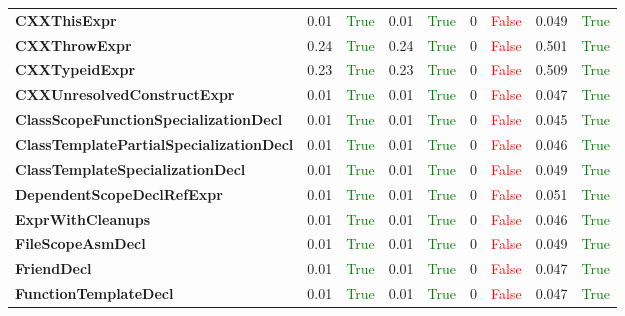 \documentclass{article}
\begin{document}
\begin{xltabular}{\textwidth}{lcccccccc}
\textbf{{\fontsize{10}{12}\selectfont CXXThisExpr}}& 0.01&\textcolor{green}{True}& 0.01&\textcolor{green}{True}& 0&\textcolor{red}{False}& 0.049&\textcolor{green}{True} \\[0.5ex]
\textbf{{\fontsize{10}{12}\selectfont CXXThrowExpr}}& 0.24&\textcolor{green}{True}& 0.24&\textcolor{green}{True}& 0&\textcolor{red}{False}& 0.501&\textcolor{green}{True} \\[0.5ex]
\textbf{{\fontsize{10}{12}\selectfont CXXTypeidExpr}}& 0.23&\textcolor{green}{True}& 0.23&\textcolor{green}{True}& 0&\textcolor{red}{False}& 0.509&\textcolor{green}{True} \\[0.5ex]
\textbf{{\fontsize{10}{12}\selectfont CXXUnresolvedConstructExpr}}& 0.01&\textcolor{green}{True}& 0.01&\textcolor{green}{True}& 0&\textcolor{red}{False}& 0.047&\textcolor{green}{True} \\[0.5ex]
\textbf{{\fontsize{10}{12}\selectfont ClassScopeFunctionSpecializationDecl}}& 0.01&\textcolor{green}{True}& 0.01&\textcolor{green}{True}& 0&\textcolor{red}{False}& 0.045&\textcolor{green}{True} \\[0.5ex]
\textbf{{\fontsize{10}{12}\selectfont ClassTemplatePartialSpecializationDecl}}& 0.01&\textcolor{green}{True}& 0.01&\textcolor{green}{True}& 0&\textcolor{red}{False}& 0.046&\textcolor{green}{True} \\[0.5ex]
\textbf{{\fontsize{10}{12}\selectfont ClassTemplateSpecializationDecl}}& 0.01&\textcolor{green}{True}& 0.01&\textcolor{green}{True}& 0&\textcolor{red}{False}& 0.049&\textcolor{green}{True} \\[0.5ex]
\textbf{{\fontsize{10}{12}\selectfont DependentScopeDeclRefExpr}}& 0.01&\textcolor{green}{True}& 0.01&\textcolor{green}{True}& 0&\textcolor{red}{False}& 0.051&\textcolor{green}{True} \\[0.5ex]
\textbf{{\fontsize{10}{12}\selectfont ExprWithCleanups}}& 0.01&\textcolor{green}{True}& 0.01&\textcolor{green}{True}& 0&\textcolor{red}{False}& 0.046&\textcolor{green}{True} \\[0.5ex]
\textbf{{\fontsize{10}{12}\selectfont FileScopeAsmDecl}}& 0.01&\textcolor{green}{True}& 0.01&\textcolor{green}{True}& 0&\textcolor{red}{False}& 0.049&\textcolor{green}{True} \\[0.5ex]
\textbf{{\fontsize{10}{12}\selectfont FriendDecl}}& 0.01&\textcolor{green}{True}& 0.01&\textcolor{green}{True}& 0&\textcolor{red}{False}& 0.047&\textcolor{green}{True} \\[0.5ex]
\textbf{{\fontsize{10}{12}\selectfont FunctionTemplateDecl}}& 0.01&\textcolor{green}{True}& 0.01&\textcolor{green}{True}& 0&\textcolor{red}{False}& 0.047&\textcolor{green}{True} \\[0.5ex]

\end{xltabular}
\end{document}
